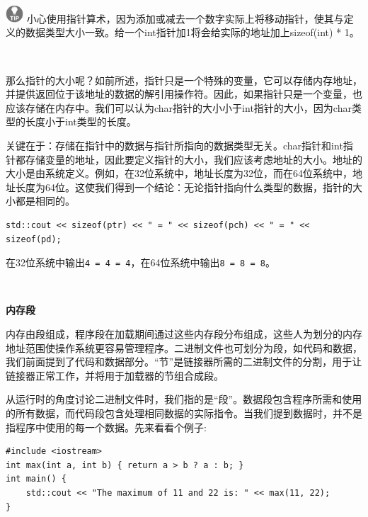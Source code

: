 \hspace*{\fill} \\ %
\includegraphics[width=0.05\textwidth]{images/tip}
小心使用指针算术，因为添加或减去一个数字实际上将移动指针，使其与定义的数据类型大小一致。给一个int指针加1将会给实际的地址加上sizeof(int) * 1。 \par
\noindent\textbf{}\ \par

那么指针的大小呢？如前所述，指针只是一个特殊的变量，它可以存储内存地址，并提供返回位于该地址的数据的解引用操作符。因此，如果指针只是一个变量，也应该存储在内存中。我们可以认为char指针的大小小于int指针的大小，因为char类型的长度小于int类型的长度。 \par
关键在于：存储在指针中的数据与指针所指向的数据类型无关。char指针和int指针都存储变量的地址，因此要定义指针的大小，我们应该考虑地址的大小。地址的大小是由系统定义。例如，在32位系统中，地址长度为32位，而在64位系统中，地址长度为64位。这使我们得到一个结论：无论指针指向什么类型的数据，指针的大小都是相同的。\par

\begin{lstlisting}[caption={}]
std::cout << sizeof(ptr) << " = " << sizeof(pch) << " = " << sizeof(pd);
\end{lstlisting}

在32位系统中输出\texttt{4 = 4 = 4}，在64位系统中输出\texttt{8 = 8 = 8}。 \par

\noindent\textbf{}\ \par
\textbf{内存段} \ \par
内存由段组成，程序段在加载期间通过这些内存段分布组成，这些人为划分的内存地址范围使操作系统更容易管理程序。二进制文件也可划分为段，如代码和数据，我们前面提到了代码和数据部分。“节”是链接器所需的二进制文件的分割，用于让链接器正常工作，并将用于加载器的节组合成段。 \par
从运行时的角度讨论二进制文件时，我们指的是“段”。数据段包含程序所需和使用的所有数据，而代码段包含处理相同数据的实际指令。当我们提到数据时，并不是指程序中使用的每一个数据。先来看看个例子: \par

\begin{lstlisting}[caption={}]
#include <iostream>
int max(int a, int b) { return a > b ? a : b; }
int main() {
	std::cout << "The maximum of 11 and 22 is: " << max(11, 22);
}
\end{lstlisting}

